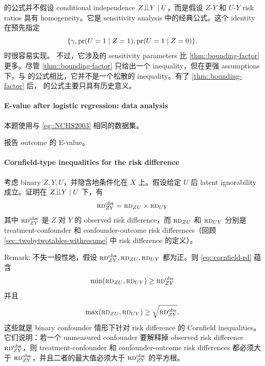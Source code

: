  
\citet{Schlesselman::1978} 的公式并不假设 conditional independence $Z\ind Y\mid U$，而是假设 $Z$-$Y$ 和 $U$-$Y$ risk ratios 具有 homogeneity。它是 sensitivity analysis 中的经典公式。这个 identity 在预先指定
$$
\{   \gamma  ,  \textup{pr}(U=1\mid Z=1), \textup{pr}(U=1\mid Z=0)  \} .
$$
时很容易实现。
不过，它涉及的 sensitivity parameters 比 \cref{thm::bounding-factor} 更多。尽管 \cref{thm::bounding-factor} 只给出一个 inequality，但在更强 assumptions 下，与 \citet{Schlesselman::1978} 的公式相比，它并不是一个松散的 inequality。有了 \cref{thm::bounding-factor} 后，\citet{Schlesselman::1978} 的公式主要只具有历史意义。



 
\paragraph{E-value after logistic regression: data analysis}\label{hw::eg::NCHS2003}

本题使用与 \cref{eg::NCHS2003} 相同的数据集。

报告 outcome  的 E-value。


\paragraph{Cornfield-type inequalities for the risk difference}\label{hw::cornfield-rd}



考虑 binary $Z, Y, U$，并隐含地条件化在 $X$ 上。假设给定 $U$ 后 latent ignorability 成立。证明在 $Z\ind Y\mid U$ 下，有
\begin{eqnarray}
\textsc{rd}_{ZY}^{\textup{obs}} = \textsc{rd}_{ZU} \times \textsc{rd}_{UY}
\label{eq::cornfield-rd}
\end{eqnarray}
其中 $\textsc{rd}_{ZY}^{\textup{obs}}$ 是 $Z$ 对 $Y$ 的 observed risk difference，而 $\textsc{rd}_{ZU}$ 和 $ \textsc{rd}_{UY}$ 分别是 treatment-confounder 和 confounder-outcome risk differences（回顾 \cref{sec::twobytwotables-withresume} 中 risk difference 的定义）。


Remark: 不失一般性地，假设 $\textsc{rd}_{ZY}^{\textup{obs}}, \textsc{rd}_{ZU} ,\textsc{rd}_{UY}$ 都为正。则 \eqref{eq::cornfield-rd} 蕴含
$$
\min(\textsc{rd}_{ZU}  , \textsc{rd}_{UY}) \geq \textsc{rd}_{ZY}^{\textup{obs}}
$$
并且
$$
\max(\textsc{rd}_{ZU}  , \textsc{rd}_{UY}) \geq  \sqrt{ \textsc{rd}_{ZY}^{\textup{obs}}} .
$$
这些就是 binary confounder 情形下针对 risk difference 的 Cornfield inequalities。
它们说明：若一个 unmeasured confounder 要解释掉 observed risk difference $\textsc{rd}_{ZY}^{\textup{obs}}$，则 treatment-confounder 和 confounder-outcome risk differences 都必须大于 $\textsc{rd}_{ZY}^{\textup{obs}}$，并且二者的最大值必须大于 $\textsc{rd}_{ZY}^{\textup{obs}}$ 的平方根。

